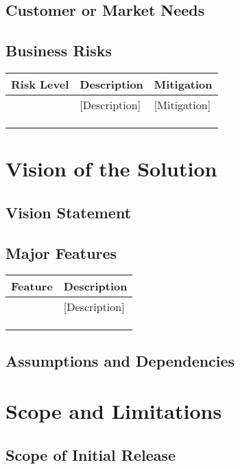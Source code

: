 \documentclass[12pt]{article}
\begin{document}
\subsection{Customer or Market Needs}

\subsection{Business Risks}
\begin{tabular}{|l|l|l|}
\hline
\textbf{Risk Level}&\textbf{Description}&\textbf{Mitigation}\\
\hline
[Level]&[Description]&[Mitigation]\\
\hline
&&\\
\hline
&&\\
\hline
&&\\
\hline
\end{tabular}


\section{Vision of the Solution}

\subsection{Vision Statement}

\subsection{Major Features}
\begin{tabular}{|l|l|}
\hline
\textbf{Feature}&\textbf{Description}\\
\hline
[Name]&[Description]\\
\hline
&\\
\hline
&\\
\hline
&\\
\hline
\end{tabular}

\subsection{Assumptions and Dependencies}
 

\section{Scope and Limitations}

\subsection{Scope of Initial Release}
\end{document}
